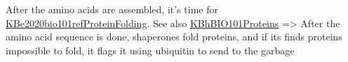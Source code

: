 \documentclass[letterpaper]{article}
\begin{document}
After the amino acids are assembled, it's time for
\href{KBe2020bio101refProteinFolding.org}{KBe2020bio101refProteinFolding}.
See also \href{KBhBIO101Proteins.org}{KBhBIO101Proteins} => After the
amino acid sequence is done, shaperones fold proteins, and if its finds
proteins impossible to fold, it flags it using ubiquitin to send to the
garbage
\end{document}
